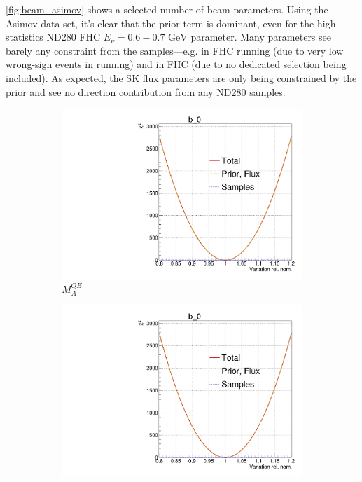 \autoref{fig:beam_asimov} shows a selected number of beam parameters. Using the Asimov data set, it's clear that the prior term is dominant, even for the high-statistics ND280 FHC \numu $E_\nu = 0.6-0.7\text{ GeV}$ parameter. Many parameters see barely any constraint from the samples---e.g. \numubar in FHC running (due to very low wrong-sign events in \numu running) and \nue in FHC (due to no dedicated \nue selection being included). As expected, the SK flux parameters are only being constrained by the prior and see no direction contribution from any ND280 samples.
\begin{figure}[!h]
	\centering
	\begin{subfigure}[t]{0.32\textwidth}
		\includegraphics[width=\textwidth, trim={0mm 0mm 0mm 11mm}, clip,page=107]{figures/mach3/Asimov/Full_LLHscan_18July_BeRPA_U_ND280logL_scan}
		\caption{$M_A^{QE}$}
	\end{subfigure}
	\begin{subfigure}[t]{0.32\textwidth}
		\includegraphics[width=\textwidth, trim={0mm 0mm 0mm 11mm}, clip,page=110]{figures/mach3/Asimov/Full_LLHscan_18July_BeRPA_U_ND280logL_scan}

\end{subfigure}
\end{figure}

